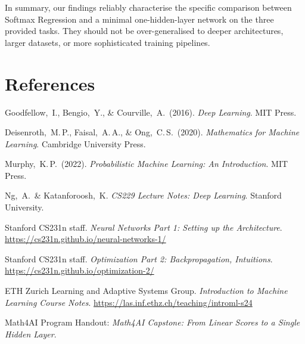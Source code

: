 \documentclass[11pt]{article}
\begin{document}
In summary, our findings reliably characterise the specific comparison between Softmax Regression
and a minimal one-hidden-layer network on the three provided tasks.  They should not be
over-generalised to deeper architectures, larger datasets, or more sophisticated training
pipelines.

\newpage
\section*{References}
\begin{enumerate}[label={[\arabic*]},leftmargin=2em,itemsep=0.2em]
  \item Goodfellow,~I., Bengio,~Y., \& Courville,~A.\ (2016). \textit{Deep Learning}. MIT
        Press.
  \item Deisenroth,~M.\,P., Faisal,~A.\,A., \& Ong,~C.\,S.\ (2020). \textit{Mathematics for
        Machine Learning}. Cambridge University Press.
  \item Murphy,~K.\,P.\ (2022). \textit{Probabilistic Machine Learning: An Introduction}. MIT
        Press.
  \item Ng,~A.\ \& Katanforoosh,~K. \textit{CS229 Lecture Notes: Deep Learning}. Stanford
        University.
  \item Stanford CS231n staff. \textit{Neural Networks Part 1: Setting up the Architecture}.
        \url{https://cs231n.github.io/neural-networks-1/}
  \item Stanford CS231n staff. \textit{Optimization Part 2: Backpropagation, Intuitions}.
        \url{https://cs231n.github.io/optimization-2/}
  \item ETH Zurich Learning and Adaptive Systems Group. \textit{Introduction to Machine Learning
        Course Notes}. \url{https://las.inf.ethz.ch/teaching/introml-s24}
  \item Math4AI Program Handout: \textit{Math4AI Capstone: From Linear Scores to a Single Hidden
        Layer}.
\end{enumerate}
\end{document}
